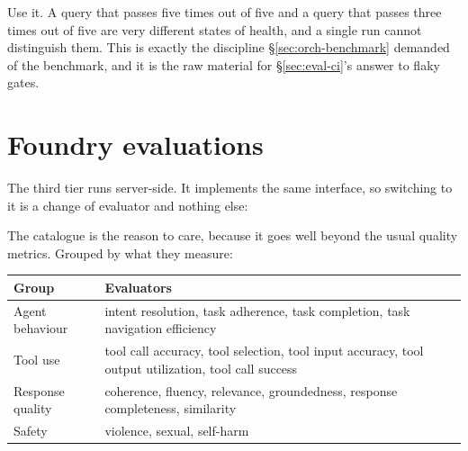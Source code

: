 Use it. A query that passes five times out of five and a query that passes three
times out of five are very different states of health, and a single run cannot
distinguish them. This is exactly the discipline \S\ref{sec:orch-benchmark}
demanded of the benchmark, and it is the raw material for
\S\ref{sec:eval-ci}'s answer to flaky gates.

\section{Foundry evaluations}
\label{sec:eval-foundry}

The third tier runs server-side. It implements the same interface, so switching
to it is a change of evaluator and nothing else:


The catalogue is the reason to care, because it goes well beyond the usual
quality metrics. Grouped by what they measure:

\begin{center}
\small
\begin{tabularx}{\linewidth}{@{}lX@{}}
\toprule
\textbf{Group} & \textbf{Evaluators} \\
\midrule
Agent behaviour & intent resolution, task adherence, task completion, task
navigation efficiency \\[4pt]
Tool use & tool call accuracy, tool selection, tool input accuracy, tool output
utilization, tool call success \\[4pt]
Response quality & coherence, fluency, relevance, groundedness, response
completeness, similarity \\[4pt]
Safety & violence, sexual, self-harm \\
\bottomrule
\end{tabularx}
\end{center}

